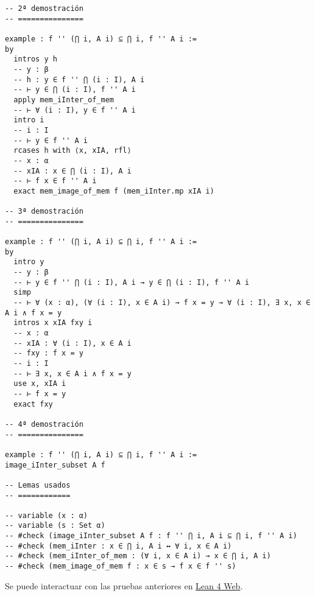 \begin{verbatim}
-- 2ª demostración
-- ===============

example : f '' (⋂ i, A i) ⊆ ⋂ i, f '' A i :=
by
  intros y h
  -- y : β
  -- h : y ∈ f '' ⋂ (i : I), A i
  -- ⊢ y ∈ ⋂ (i : I), f '' A i
  apply mem_iInter_of_mem
  -- ⊢ ∀ (i : I), y ∈ f '' A i
  intro i
  -- i : I
  -- ⊢ y ∈ f '' A i
  rcases h with ⟨x, xIA, rfl⟩
  -- x : α
  -- xIA : x ∈ ⋂ (i : I), A i
  -- ⊢ f x ∈ f '' A i
  exact mem_image_of_mem f (mem_iInter.mp xIA i)

-- 3ª demostración
-- ===============

example : f '' (⋂ i, A i) ⊆ ⋂ i, f '' A i :=
by
  intro y
  -- y : β
  -- ⊢ y ∈ f '' ⋂ (i : I), A i → y ∈ ⋂ (i : I), f '' A i
  simp
  -- ⊢ ∀ (x : α), (∀ (i : I), x ∈ A i) → f x = y → ∀ (i : I), ∃ x, x ∈ A i ∧ f x = y
  intros x xIA fxy i
  -- x : α
  -- xIA : ∀ (i : I), x ∈ A i
  -- fxy : f x = y
  -- i : I
  -- ⊢ ∃ x, x ∈ A i ∧ f x = y
  use x, xIA i
  -- ⊢ f x = y
  exact fxy

-- 4ª demostración
-- ===============

example : f '' (⋂ i, A i) ⊆ ⋂ i, f '' A i :=
image_iInter_subset A f

-- Lemas usados
-- ============

-- variable (x : α)
-- variable (s : Set α)
-- #check (image_iInter_subset A f : f '' ⋂ i, A i ⊆ ⋂ i, f '' A i)
-- #check (mem_iInter : x ∈ ⋂ i, A i ↔ ∀ i, x ∈ A i)
-- #check (mem_iInter_of_mem : (∀ i, x ∈ A i) → x ∈ ⋂ i, A i)
-- #check (mem_image_of_mem f : x ∈ s → f x ∈ f '' s)
\end{verbatim}
Se puede interactuar con las pruebas anteriores en \href{https://lean.math.hhu.de/\#url=https://raw.githubusercontent.com/jaalonso/Calculemus2/main/src/Imagen\_de\_la\_interseccion\_general.lean}{Lean 4 Web}.

